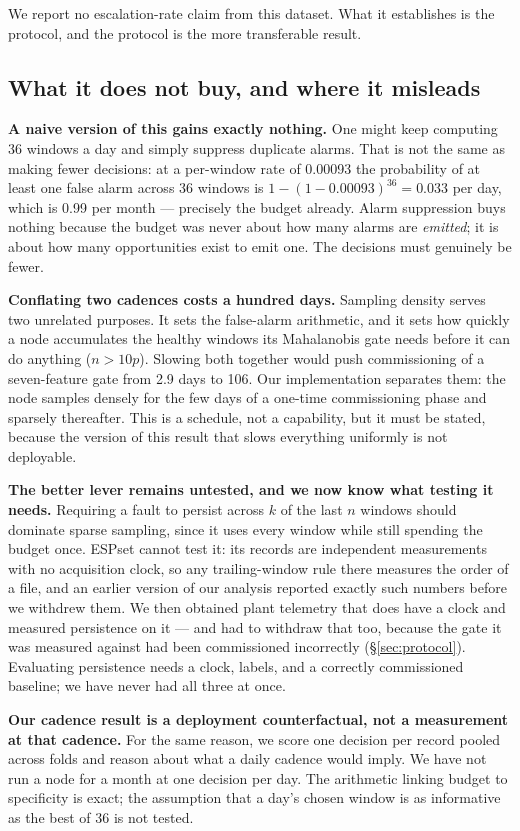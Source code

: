 \documentclass[conference,a4paper,10pt]{IEEEtran}
\begin{document}
We report no escalation-rate claim from this dataset. What it establishes is the
protocol, and the protocol is the more transferable result.

\subsection{What it does not buy, and where it misleads}
\textbf{A naive version of this gains exactly nothing.} One might keep computing
36 windows a day and simply suppress duplicate alarms. That is not the same as
making fewer decisions: at a per-window rate of 0.00093 the probability of at least
one false alarm across 36 windows is $1-(1-0.00093)^{36} = 0.033$ per day, which is
0.99 per month --- precisely the budget already. Alarm suppression buys nothing
because the budget was never about how many alarms are \emph{emitted}; it is about
how many opportunities exist to emit one. The decisions must genuinely be fewer.

\textbf{Conflating two cadences costs a hundred days.} Sampling density serves two
unrelated purposes. It sets the false-alarm arithmetic, and it sets how quickly a
node accumulates the healthy windows its Mahalanobis gate needs before it can do
anything ($n > 10p$). Slowing both together would push commissioning of a
seven-feature gate from 2.9 days to 106. Our implementation separates them: the
node samples densely for the few days of a one-time commissioning phase and
sparsely thereafter. This is a schedule, not a capability, but it must be stated,
because the version of this result that slows everything uniformly is not
deployable.

\label{sec:persist}
\textbf{The better lever remains untested, and we now know what testing it needs.}
Requiring a fault to persist across $k$ of the last $n$ windows should dominate
sparse sampling, since it uses every window while still spending the budget once.
ESPset cannot test it: its records are independent measurements with no acquisition
clock, so any trailing-window rule there measures the order of a file, and an
earlier version of our analysis reported exactly such numbers before we withdrew
them. We then obtained plant telemetry that does have a clock and measured
persistence on it --- and had to withdraw that too, because the gate it was measured
against had been commissioned incorrectly (\S\ref{sec:protocol}). Evaluating
persistence needs a clock, labels, and a correctly commissioned baseline; we have
never had all three at once.

\textbf{Our cadence result is a deployment counterfactual, not a measurement at
that cadence.} For the same reason, we score one decision per record pooled across
folds and reason about what a daily cadence would imply. We have not run a node for
a month at one decision per day. The arithmetic linking budget to specificity is
exact; the assumption that a day's chosen window is as informative as the best of
36 is not tested.
\end{document}
